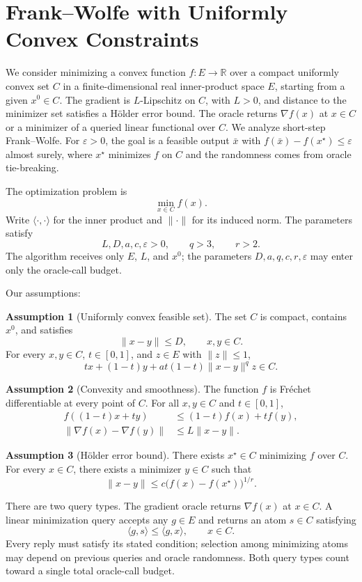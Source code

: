 \documentclass[10pt]{article}
\theoremstyle{definition}
\newtheorem{assumption}{Assumption}
\begin{document}
\section*{Frank--Wolfe with Uniformly Convex Constraints}
We consider minimizing a convex function $f:E\to\mathbb{R}$ over a compact uniformly convex set $C$ in a finite-dimensional real inner-product space $E$, starting from a given $x^0\in C$. The gradient is $L$-Lipschitz on $C$, with $L>0$, and distance to the minimizer set satisfies a H\"older error bound. The oracle returns $\nabla f(x)$ at $x\in C$ or a minimizer of a queried linear functional over $C$. We analyze short-step Frank--Wolfe. For $\varepsilon>0$, the goal is a feasible output $\bar{x}$ with $f(\bar{x})-f(x^\star)\leq\varepsilon$ almost surely, where $x^\star$ minimizes $f$ on $C$ and the randomness comes from oracle tie-breaking.

The optimization problem is
\[
\min_{x\in C} f(x).
\]
Write $\langle\cdot,\cdot\rangle$ for the inner product and $\|\cdot\|$ for its induced norm. The parameters satisfy
\[
L,D,a,c,\varepsilon>0,\qquad q>3,\qquad r>2.
\]
The algorithm receives only $E$, $L$, and $x^0$; the parameters $D,a,q,c,r,\varepsilon$ may enter only the oracle-call budget.

Our assumptions:
\begin{assumption}[Uniformly convex feasible set]
The set $C$ is compact, contains $x^0$, and satisfies
\[
\|x-y\|\leq D,\qquad x,y\in C.
\]
For every $x,y\in C$, $t\in[0,1]$, and $z\in E$ with $\|z\|\leq1$,
\[
tx+(1-t)y+a t(1-t)\|x-y\|^q z\in C.
\]
\end{assumption}

\begin{assumption}[Convexity and smoothness]
The function $f$ is Fr\'echet differentiable at every point of $C$. For all $x,y\in C$ and $t\in[0,1]$,
\[
\begin{aligned}
f((1-t)x+ty)&\leq(1-t)f(x)+t f(y),\\
\|\nabla f(x)-\nabla f(y)\|&\leq L\|x-y\|.
\end{aligned}
\]
\end{assumption}

\begin{assumption}[H\"older error bound]
There exists $x^\star\in C$ minimizing $f$ over $C$. For every $x\in C$, there exists a minimizer $y\in C$ such that
\[
\|x-y\|\leq c\bigl(f(x)-f(x^\star)\bigr)^{1/r}.
\]
\end{assumption}

There are two query types. The gradient oracle returns $\nabla f(x)$ at $x\in C$. A linear minimization query accepts any $g\in E$ and returns an atom $s\in C$ satisfying
\[
\langle g,s\rangle\leq\langle g,x\rangle,
\qquad x\in C.
\]
Every reply must satisfy its stated condition; selection among minimizing atoms may depend on previous queries and oracle randomness. Both query types count toward a single total oracle-call budget.
\end{document}
